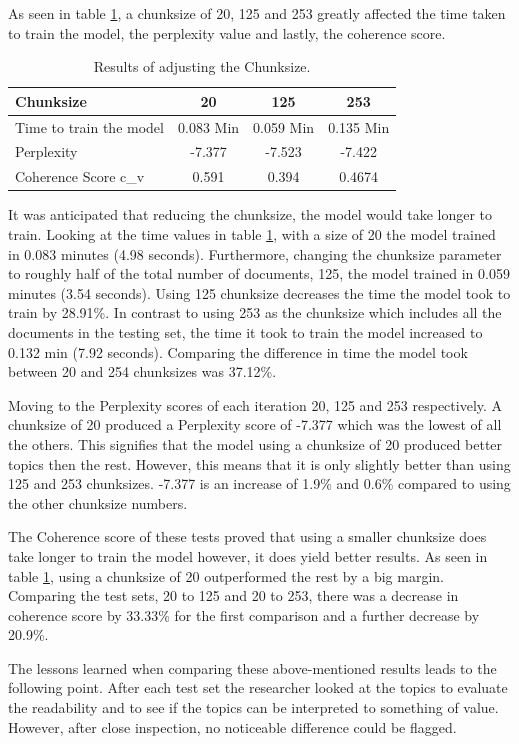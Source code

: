 As seen in table \ref{tab:chunksize}, a chunksize of 20, 125 and 253 greatly affected the time taken to train the model, the perplexity value and lastly, the coherence score. 
\begin{table}[]
\centering
\begin{tabular}{|l|c|c|c|}
\hline
Chunksize & 20 & 125 & 253 \\ \hline
Time to train the model & 0.083 Min & 0.059 Min & 0.135 Min \\ \hline
Perplexity & -7.377 & -7.523 & -7.422 \\ \hline
Coherence Score c\_v & 0.591 & 0.394 & 0.4674 \\ \hline
\end{tabular}
\caption{Results of adjusting the Chunksize.}
\label{tab:chunksize}
\end{table}

It was anticipated that reducing the chunksize, the model would take longer to train. Looking at the time values in table \ref{tab:chunksize}, with a size of 20 the model trained in 0.083 minutes (4.98 seconds). Furthermore, changing the chunksize parameter to roughly half of the total number of documents, 125, the model trained in 0.059 minutes (3.54 seconds). Using 125 chunksize decreases the time the model took to train by 28.91\%. In contrast to using 253 as the chunksize which includes all the documents in the testing set, the time it took to train the model increased to 0.132 min (7.92 seconds). Comparing the difference in time the model took between 20 and 254 chunksizes was 37.12\%. 

Moving to the Perplexity scores of each iteration 20, 125 and 253 respectively.
A chunksize of 20 produced a Perplexity score of -7.377 which was the lowest of all the others. This signifies that the model using a chunksize of 20 produced better topics then the rest. However, this means that it is only slightly better than using 125 and 253 chunksizes. -7.377 is an increase of 1.9\% and 0.6\% compared to using the other chunksize numbers.

The Coherence score of these tests proved that using a smaller chunksize does take longer to train the model however, it does yield better results. As seen in table \ref{tab:chunksize}, using a chunksize of 20 outperformed the rest by a big margin. Comparing the test sets, 20 to 125 and 20 to 253, there was a decrease in coherence score by 33.33\% for the first comparison and a further decrease by 20.9\%. 

The lessons learned when comparing these above-mentioned results leads to the following point. After each test set the researcher looked at the topics to evaluate the readability and to see if the topics can be interpreted to something of value. However, after close inspection, no noticeable difference could be flagged. 

